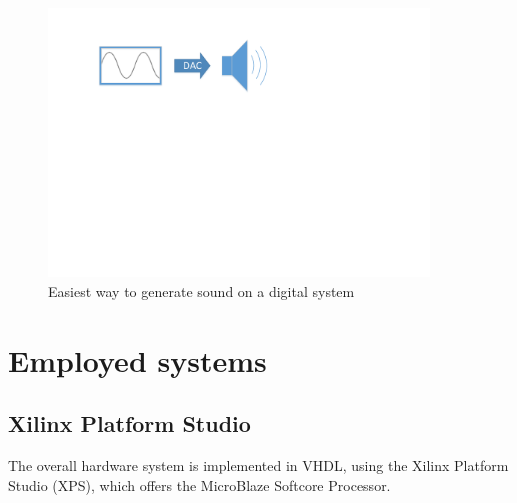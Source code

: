 	  	\begin{figure}[!h]
		\centering
			\includegraphics[width=0.90\textwidth]{images/sound_generation.pdf}
		\caption{Easiest way to generate sound on a digital system}
		\label{fig:sound_generation}
	\end{figure}
		
		
		
		
			
			
			
		
	\section{Employed systems}
	  \subsection{Xilinx Platform Studio}
	    The overall hardware system is implemented in VHDL, using the Xilinx Platform Studio (XPS), which offers the MicroBlaze Softcore Processor.
